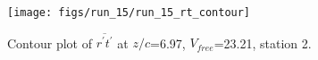 \begin{figure}[H]
\centering
\texttt{[image: figs/run\_15/run\_15\_rt\_contour]}
\caption{Contour plot of $\overline{r^\prime t^\prime}$ at $z/c$=6.97, $V_{free}$=23.21, station 2.}
\label{fig:run_15_rt_contour}
\end{figure}


